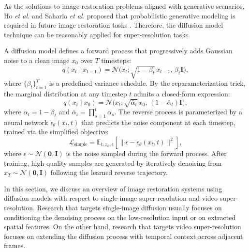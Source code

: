 As the solutions to image restoration problems aligned with 
generative scenarios, Ho \emph{et al.} and Saharia \emph{et al.} 
proposed that probabilistic generative modeling is required 
in future image restoration tasks 
\cite{ho2020ddpm, saharia2022sr3}. Therefore, the diffusion 
model technique can be reasonably applied for super-resolution 
tasks.

A diffusion model defines a forward process that progressively 
adds Gaussian noise to a clean image $x_0$ over $T$ timesteps:
\begin{equation}
    q(x_t \mid x_{t-1}) = 
    \mathcal{N}\big(x_t; \sqrt{1-\beta_t}\, x_{t-1},\, 
    \beta_t \mathbf{I}\big),
    \label{eq:forward_process}
\end{equation}
where $\{\beta_t\}_{t=1}^T$ is a predefined variance schedule. 
By the reparameterization trick, the marginal distribution at 
any timestep $t$ admits a closed-form expression:
\begin{equation}
    q(x_t \mid x_0) = 
    \mathcal{N}\big(x_t; \sqrt{\bar{\alpha}_t}\, x_0,\, 
    (1-\bar{\alpha}_t)\mathbf{I}\big),
    \label{eq:closed_forward}
\end{equation}
where $\alpha_t = 1 - \beta_t$ and 
$\bar{\alpha}_t = \prod_{s=1}^{t} \alpha_s$. The reverse 
process is parameterized by a neural network 
$\epsilon_\theta(x_t, t)$ that predicts the noise component at 
each timestep, trained via the simplified objective:
\begin{equation}
    \mathcal{L}_{\mathrm{simple}} = 
    \mathbb{E}_{t, x_0, \epsilon} \!\left[ 
    \big\| \epsilon - \epsilon_\theta(x_t, t) \big\|^2 \right],
    \label{eq:ddpm_loss}
\end{equation}
where $\epsilon \sim \mathcal{N}(\mathbf{0}, \mathbf{I})$ is 
the noise sampled during the forward process. After training, 
high-quality samples are generated by iteratively denoising 
from $x_T \sim \mathcal{N}(\mathbf{0}, \mathbf{I})$ following 
the learned reverse trajectory.

In this section, we discuss an overview of image restoration 
systems using diffusion models with respect to single-image 
super-resolution and video super-resolution. Research that 
targets single-image diffusion usually focuses on conditioning 
the denoising process on the low-resolution input or on 
extracted spatial features. On the other hand, research that 
targets video super-resolution focuses on extending the 
diffusion process with temporal context across adjacent frames.


